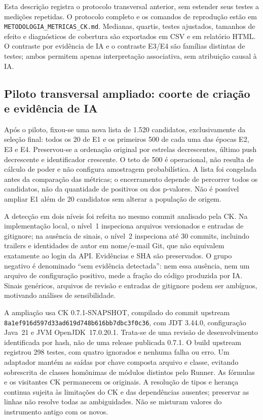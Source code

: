 Esta descrição registra o protocolo transversal anterior, sem estender seus testes a medições repetidas. O protocolo completo e os comandos de reprodução estão em \texttt{METODOLOGIA\_METRICAS\_CK.md}. Medianas, quartis, testes ajustados, tamanhos de efeito e diagnósticos de cobertura são exportados em CSV e em relatório HTML. O contraste por evidência de IA e o contraste E3/E4 são famílias distintas de testes; ambos permitem apenas interpretação associativa, sem atribuição causal à IA.

\subsection{Piloto transversal ampliado: coorte de criação e evidência de IA}
\label{subsec:ampliacao-ck}

Após o piloto, fixou-se uma nova lista de 1.520 candidatos, exclusivamente da seleção final: todos os 20 de E1 e os primeiros 500 de cada uma das épocas E2, E3 e E4. Preservou-se a ordenação original por estrelas decrescentes, último push decrescente e identificador crescente. O teto de 500 é operacional, não resulta de cálculo de poder e não configura amostragem probabilística. A lista foi congelada antes da comparação das métricas; o encerramento depende de percorrer todos os candidatos, não da quantidade de positivos ou dos p-valores. Não é possível ampliar E1 além de 20 candidatos sem alterar a população de origem.

A detecção em dois níveis foi refeita no mesmo commit analisado pela CK. Na implementação local, o nível~1 inspeciona arquivos versionados e entradas de gitignore; na ausência de sinais, o nível~2 inspeciona até 30 commits, incluindo trailers e identidades de autor em nome/e-mail Git, que não equivalem exatamente ao login da API. Evidências e SHA são preservados. O grupo negativo é denominado ``sem evidência detectada'': nem essa ausência, nem um arquivo de configuração positivo, mede a fração do código produzida por IA. Sinais genéricos, arquivos de revisão e entradas de gitignore podem ser ambíguos, motivando análises de sensibilidade.

A ampliação usa CK 0.7.1-SNAPSHOT, compilado do commit upstream \texttt{8a1ef916d597d33ad619d748b616bb7dbc3f0c36}, com JDT 3.44.0, configuração Java~21 e JVM OpenJDK~17.0.20.1. Trata-se de uma revisão de desenvolvimento identificada por hash, não de uma release publicada 0.7.1. O build upstream registrou 298 testes, com quatro ignorados e nenhuma falha ou erro. Um adaptador mantém as saídas por chave composta arquivo e classe, evitando sobrescrita de classes homônimas de módulos distintos pelo Runner. As fórmulas e os visitantes CK permanecem os originais. A resolução de tipos e herança continua sujeita às limitações do CK e das dependências ausentes; preservar as linhas não resolve todas as ambiguidades. Não se misturam valores do instrumento antigo com os novos.

